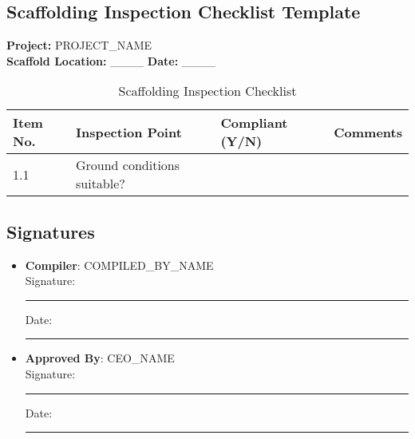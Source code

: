 \documentclass[11pt]{article}
\newcommand{\projectName}{{{PROJECT_NAME}}}
\newcommand{\compilerName}{{{COMPILED_BY_NAME}}}
\begin{document}
\subsection*{Scaffolding Inspection Checklist Template}

\textbf{Project:} \projectName \\
\textbf{Scaffold Location:} \_\_\_\_ \textbf{Date:} \_\_\_\_

\begin{table}[h]
    \centering
    \begin{tabular}{p{3cm}p{6cm}p{2cm}p{3cm}}
        \toprule
        \textbf{Item No.} & \textbf{Inspection Point} & \textbf{Compliant (Y/N)} & \textbf{Comments} \\
        \midrule
        1.1 & Ground conditions suitable? & & \\
        \bottomrule
    \end{tabular}
    \caption{Scaffolding Inspection Checklist}
\end{table}

\subsection*{Signatures}
\begin{itemize}
  \item \textbf{Compiler}: \compilerName \\
    Signature: \rule{5cm}{0.4pt} \quad Date: \rule{3cm}{0.4pt}
  \item \textbf{Approved By}: {{CEO_NAME}} \\
    Signature: \rule{5cm}{0.4pt} \quad Date: \rule{3cm}{0.4pt}
\end{itemize}
\end{document}
